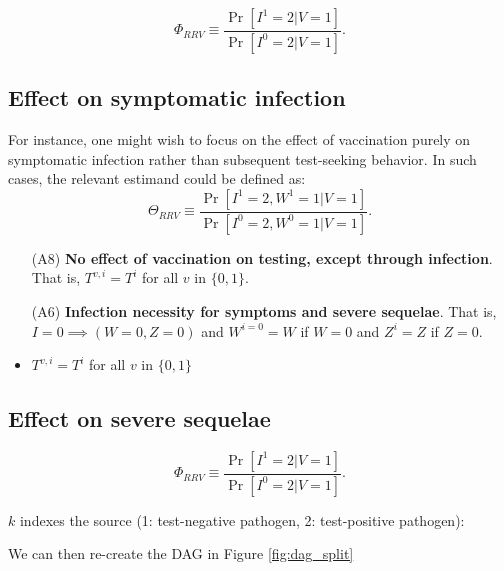 \begin{appendix}
    \[\Phi_{RRV} \equiv \dfrac{\Pr[I^1 = 2 | V = 1]}{\Pr[I^0 = 2 | V = 1]}.\]

    
    \subsection{Effect on symptomatic infection}
    For instance, one might wish to focus on the effect of vaccination purely on symptomatic infection rather than subsequent test-seeking behavior. In such cases, the relevant estimand could be defined as:
    \[\Theta_{RRV} \equiv \dfrac{\Pr[I^1 = 2, W^1 = 1 | V = 1]}{\Pr[I^0 = 2, W^0 = 1| V = 1]}.\]

    \begin{itemize}
        \item [(A8)] \textbf{No effect of vaccination on testing, except through infection}. That is, $T^{v, i} = T^{i}$ for all $v$ in $\{0, 1\}$.
        \item [(A6)] \textbf{Infection necessity for symptoms and severe sequelae}. That is, \\$I = 0 \implies (W = 0, Z = 0)$ and $W^{i=0} = W$ if $W = 0$ and $Z^i=Z$ if $Z=0$.
    \end{itemize}

    \begin{itemize}
        \item $T^{v, i} = T^{i}$ for all $v$ in $\{0, 1\}$
    \end{itemize}

    \subsection{Effect on severe sequelae}

    \[\Phi_{RRV} \equiv \dfrac{\Pr[I^1 = 2 | V = 1]}{\Pr[I^0 = 2 | V = 1]}.\]

   $k$ indexes the source (1: test-negative pathogen, 2: test-positive pathogen):

    We can then re-create the DAG in Figure \ref{fig:dag_split} 

    \begin{figure}[p]
        \centering
\end{figure}
\end{appendix}
